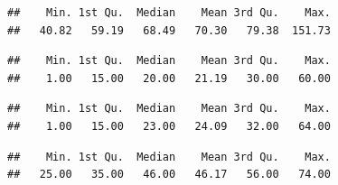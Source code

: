 \documentclass[
  10pt,
]{book}
\newenvironment{Shaded}{\begin{snugshade}}{\end{snugshade}}
\newcommand{\DecValTok}[1]{\textcolor[rgb]{0.00,0.00,0.81}{#1}}
\newcommand{\KeywordTok}[1]{\textcolor[rgb]{0.13,0.29,0.53}{\textbf{#1}}}
\newcommand{\NormalTok}[1]{#1}
\newcommand{\OperatorTok}[1]{\textcolor[rgb]{0.81,0.36,0.00}{\textbf{#1}}}
\newcommand{\StringTok}[1]{\textcolor[rgb]{0.31,0.60,0.02}{#1}}
\begin{document}
\begin{verbatim}
##    Min. 1st Qu.  Median    Mean 3rd Qu.    Max. 
##   40.82   59.19   68.49   70.30   79.38  151.73
\end{verbatim}

\begin{Shaded}
\end{Shaded}

\begin{verbatim}
##    Min. 1st Qu.  Median    Mean 3rd Qu.    Max. 
##    1.00   15.00   20.00   21.19   30.00   60.00
\end{verbatim}

\begin{Shaded}
\end{Shaded}

\begin{verbatim}
##    Min. 1st Qu.  Median    Mean 3rd Qu.    Max. 
##    1.00   15.00   23.00   24.09   32.00   64.00
\end{verbatim}

\begin{Shaded}
\end{Shaded}

\begin{verbatim}
##    Min. 1st Qu.  Median    Mean 3rd Qu.    Max. 
##   25.00   35.00   46.00   46.17   56.00   74.00
\end{verbatim}

\begin{Shaded}
\end{Shaded}
\end{document}
